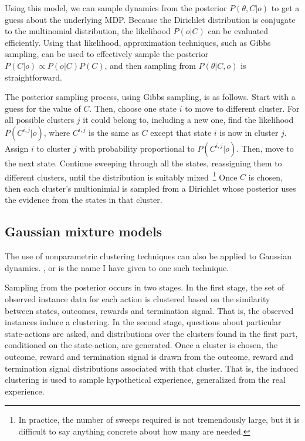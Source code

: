Using this model, we can sample dynamics from the posterior $P(\theta, C|o)$ to get a guess about the underlying MDP. Because the Dirichlet distribution is conjugate to the multinomial distribution, the likelihood $P(o|C)$ can be evaluated efficiently. Using that likelihood, approximation techniques, such as Gibbs sampling, can be used to effectively sample the posterior $P(C|o)\propto P(o|C)P(C)$, and then sampling from $P(\theta|C,o)$ is straightforward.

The posterior sampling process, using Gibbs sampling, is as follows. Start with a guess for the value of $C$. Then, choose one state $i$ to move to different cluster. For all possible clusters $j$ it could belong to, including a new one, find the likelihood $P(C^{i,j}|o)$, where $C^{i,j}$ is the same as $C$ except that state $i$ is now in cluster $j$. Assign $i$ to cluster $j$ with probability proportional to $P(C^{i,j}|o)$. Then, move to the next state. Continue sweeping through all the states, reassigning them to different clusters, until the distribution is suitably mixed~\footnote{In practice, the number of sweeps required is not tremendously large, but it is difficult to say anything concrete about how many are needed.} Once $C$ is chosen, then each cluster's multionimial is sampled from a Dirichlet whose posterior uses the evidence from the states in that cluster.

\subsection{Gaussian mixture models}

The use of nonparametric clustering techniques can also be applied to Gaussian dynamics. , or  is the name I have given to one such technique.

Sampling from the  posterior occurs in two stages. In the first stage, the set of observed instance data for each action is clustered based on the similarity between states, outcomes, rewards and termination signal. That is, the observed instances induce a clustering. In the second stage, questions about particular state-actions are asked, and distributions over the clusters found in the first part, conditioned on the state-action, are generated. Once a cluster is chosen, the outcome, reward and termination signal is drawn from the outcome, reward and termination signal distributions associated with that cluster. That is, the induced clustering is used to sample hypothetical experience, generalized from the real experience.

